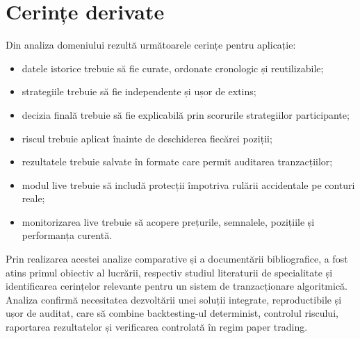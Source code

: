 \section{Cerințe derivate}
\label{cap:cap2:cerinte}

Din analiza domeniului rezultă următoarele cerințe pentru aplicație:
\begin{itemize}
    \item datele istorice trebuie să fie curate, ordonate cronologic și reutilizabile;
    \item strategiile trebuie să fie independente și ușor de extins;
    \item decizia finală trebuie să fie explicabilă prin scorurile strategiilor participante;
    \item riscul trebuie aplicat înainte de deschiderea fiecărei poziții;
    \item rezultatele trebuie salvate în formate care permit auditarea tranzacțiilor;
    \item modul live trebuie să includă protecții împotriva rulării accidentale pe conturi reale;
    \item monitorizarea live trebuie să acopere prețurile, semnalele, pozițiile și performanța curentă.
\end{itemize}

Prin realizarea acestei analize comparative și a documentării bibliografice, a fost atins primul obiectiv al lucrării, respectiv studiul literaturii de specialitate și identificarea cerințelor relevante pentru un sistem de tranzacționare algoritmică. Analiza confirmă necesitatea dezvoltării unei soluții integrate, reproductibile și ușor de auditat, care să combine backtesting-ul determinist, controlul riscului, raportarea rezultatelor și verificarea controlată în regim paper trading.
